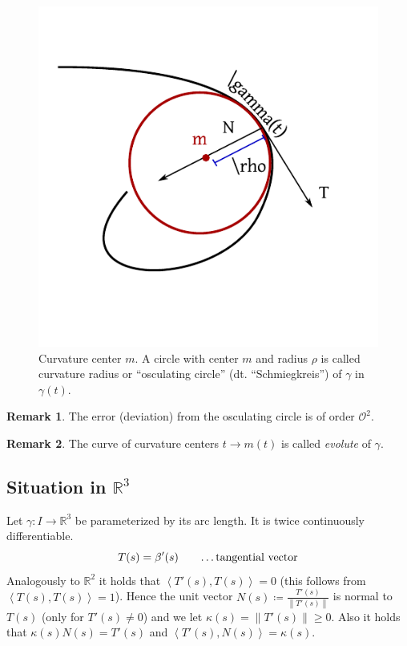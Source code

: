 \documentclass[a4paper,landscape,twocolumn]{article}
\theoremstyle{definition}
\newtheorem{rem}{Remark}
\newcommand\norm[1]{\left\|#1\right\|}
\newcommand\ang[2]{\left\langle#1,#2\right\rangle}
\begin{document}
\begin{figure}[!h]
  \begin{center}
    \includegraphics{img/curvature_center.pdf}
    \caption{Curvature center $m$.
      A circle with center $m$ and radius $\rho$ is called curvature radius
      or \enquote{osculating circle} (dt. \enquote{Schmiegkreis}) of $\gamma$ in $\gamma(t)$.
    }
    \label{img:curvature-center}
  \end{center}
\end{figure}

\begin{rem}
  The error (deviation) from the osculating circle is of order $\mathcal O^2$.
\end{rem}
\begin{rem}
  The curve of curvature centers $t \to m(t)$ is called \emph{evolute}
  of $\gamma$.
\end{rem}

\subsection{Situation in $\mathbb R^3$}
%
Let $\gamma: I \to \mathbb R^3$ be parameterized by its arc length.
It is twice continuously differentiable.
\[ T(s) = \beta'(s) \qquad \text{\dots tangential vector} \]
Analogously to $\mathbb R^2$ it holds that $\ang{T'(s)}{T(s)} = 0$
(this follows from $\ang{T(s)}{T(s)} = 1$).
Hence the unit vector $N(s) \coloneqq \frac{T'(s)}{\norm{T'(s)}}$
is normal to $T(s)$ (only for $T'(s) \neq 0$) and we let $\kappa(s) = \norm{T'(s)} \geq 0$.
Also it holds that $\kappa(s) N(s) = T'(s)$ and $\ang{T'(s)}{N(s)} = \kappa(s)$.
\end{document}
